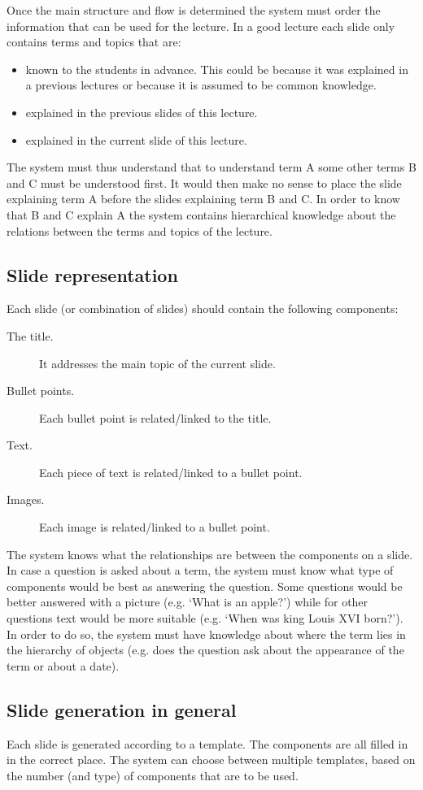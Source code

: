 \documentclass[11pt]{article}
\begin{document}
Once the main structure and flow is determined the system must order the information that can be used for the lecture. In a good lecture each slide only contains terms and topics that are:
\begin{itemize}
\item known to the students in advance. This could be because it was explained in a previous lectures or because it is assumed to be common knowledge.
\item explained in the previous slides of this lecture.
\item explained in the current slide of this lecture.
\end{itemize}
The system must thus understand that to understand term A some other terms B and C must be understood first. It would then make no sense to place the slide explaining term A before the slides explaining term B and C. In order to know that B and C explain A the system contains hierarchical knowledge about the relations between the terms and topics of the lecture.

\subsection{Slide representation}
Each slide (or combination of slides) should contain the following components:
\begin{description}
\item[The title.] It addresses the main topic of the current slide.
\item[Bullet points.] Each bullet point is related/linked to the title. 
\item[Text.] Each piece of text is related/linked to a bullet point.
\item[Images.] Each image is related/linked to a bullet point.
\end{description}
The system knows what the relationships are between the components on a slide. In case a question is asked about a term, the system must know what type of components would be best as answering the question. Some questions would be better answered with a picture (e.g. `What is an apple?’) while for other questions text would be more suitable (e.g. `When was king Louis XVI born?’). In order to do so, the system must have knowledge about where the term lies in the hierarchy of objects (e.g. does the question ask about the appearance of the term or about a date).

\subsection{Slide generation in general}
Each slide is generated according to a template. The components are all filled in in the correct place. The system can choose between multiple templates, based on the number (and type) of components that are to be used. 
\end{document}

